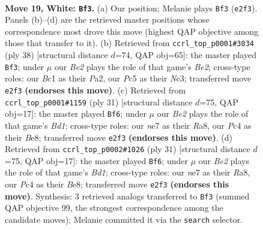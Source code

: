 \documentclass[11pt]{article}
\begin{document}
\clearpage

\begin{figure}[p]\centering
\begin{subfigure}{0.46\textwidth}\centering
\resizebox{\linewidth}{!}{%
\newchessgame
\chessboard[
  setfen={r1b2rk1/p3np1p/1p2pnp1/2P5/2P5/4P3/P1N1BPPP/1RB1R1K1 w - - 0 19},
  showmover=false,
  pgfstyle=straightmove, color=movearrow, markmove={e2-f3}
]}
\caption{}
\end{subfigure}\hfill
\begin{subfigure}{0.46\textwidth}\centering
\resizebox{\linewidth}{!}{%
\newchessgame
\chessboard[
  setfen={r1b2rk1/5p1p/2p1pnp1/p2p4/4PP2/2N5/PPPRB1PP/2K1R3 w - - 0 20},
  showmover=false,
  pgfstyle=straightmove, color=movearrow, markmove={e2-f3}
]}
\caption{}
\end{subfigure}
\\[4pt]
\begin{subfigure}{0.46\textwidth}\centering
\resizebox{\linewidth}{!}{%
\newchessgame
\chessboard[
  setfen={r2bbrk1/5ppp/p3p3/1p6/4P2P/P1N2P2/1PP3P1/1K1R1B1R b - - 0 16},
  showmover=false,
  pgfstyle=straightmove, color=movearrow, markmove={d8-f6}
]}
\caption{}
\end{subfigure}\hfill
\begin{subfigure}{0.46\textwidth}\centering
\resizebox{\linewidth}{!}{%
\newchessgame
\chessboard[
  setfen={r2bbrk1/5ppp/p3p3/1p6/4P2P/P1N2P2/1PP3P1/1K1R1B1R b - - 0 16},
  showmover=false,
  pgfstyle=straightmove, color=movearrow, markmove={d8-f6}
]}
\caption{}
\end{subfigure}
\caption{\textbf{Move 19, White: \texttt{Bf3}.} (a) Our position; Melanie plays \texttt{Bf3} (\texttt{e2f3}). Panels (b)--(d) are the retrieved master positions whose correspondence most drove this move (highest QAP objective among those that transfer to it). (b) Retrieved from \texttt{ccrl\_top\_p0001\#3034} (ply 38) [structural distance $d$=74, QAP obj=65]: the master played \texttt{Bf3}; under $\mu$ our \emph{Be2} plays the role of that game's \emph{Be2}; cross-type roles: our \emph{B}c1 as their \emph{P}a2, our \emph{P}c5 as their \emph{N}c3; transferred move \texttt{e2f3} \textbf{(endorses this move)}. (c) Retrieved from \texttt{ccrl\_top\_p0001\#1159} (ply 31) [structural distance $d$=75, QAP obj=17]: the master played \texttt{Bf6}; under $\mu$ our \emph{Be2} plays the role of that game's \emph{Bd1}; cross-type roles: our \emph{n}e7 as their \emph{R}a8, our \emph{P}c4 as their \emph{B}e8; transferred move \texttt{e2f3} \textbf{(endorses this move)}. (d) Retrieved from \texttt{ccrl\_top\_p0002\#1026} (ply 31) [structural distance $d$=75, QAP obj=17]: the master played \texttt{Bf6}; under $\mu$ our \emph{Be2} plays the role of that game's \emph{Bd1}; cross-type roles: our \emph{n}e7 as their \emph{R}a8, our \emph{P}c4 as their \emph{B}e8; transferred move \texttt{e2f3} \textbf{(endorses this move)}. Synthesis: 3 retrieved analogs transferred to \texttt{Bf3} (summed QAP objective 99, the strongest correspondence among the candidate moves); Melanie committed it via the \texttt{search} selector.}
\label{fig:thought-m36}
\end{figure}
\end{document}
